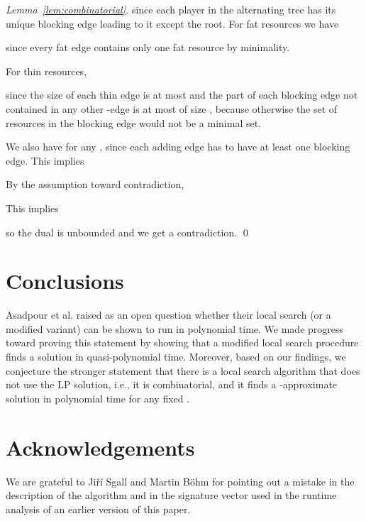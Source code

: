 \documentclass{llncs}
\begin{document}
\begin{proof}[Lemma~\ref{lem:combinatorial}]
since each player in the alternating tree has its unique blocking edge leading
to it except the root. For fat resources we have

since every fat edge contains only one fat resource by minimality.

For thin resources,

since the size of each thin edge is at most  and the part of each
blocking edge not contained in any other -edge is at most of size ,
because otherwise the set of resources in the blocking edge would not be a
minimal set.

We also have  for any , since each adding edge has to
have at least one blocking edge.
This implies

By the assumption toward contradiction,

This implies

so the dual is unbounded and we get a contradiction. \qed
\end{proof}

\section{Conclusions}
Asadpour et al. \cite{AFS08} raised as an open question whether their local
search (or a modified variant) can be shown to run in polynomial time. We made
progress toward proving this statement by showing that a modified local search
procedure finds a solution in quasi-polynomial time. Moreover, based on our
findings, we conjecture the stronger statement that there is a local search
algorithm that does not use the LP solution, i.e., it is combinatorial, and it
finds a -approximate solution in polynomial time for any fixed
.

\section{Acknowledgements}

We are grateful to Ji\v{r}\'{i} Sgall and Martin B\"{o}hm for pointing out a mistake in the description of the
algorithm and in the signature vector used in the runtime analysis  of an earlier version
of this paper.



\end{document}
